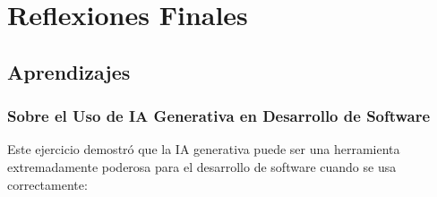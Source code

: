 \documentclass[11pt,a4paper]{article}
\begin{document}
\newpage

\section{Reflexiones Finales}

\subsection{Aprendizajes}

\subsubsection{Sobre el Uso de IA Generativa en Desarrollo de Software}

Este ejercicio demostró que la IA generativa puede ser una herramienta extremadamente poderosa para el desarrollo de software cuando se usa correctamente:
\end{document}
